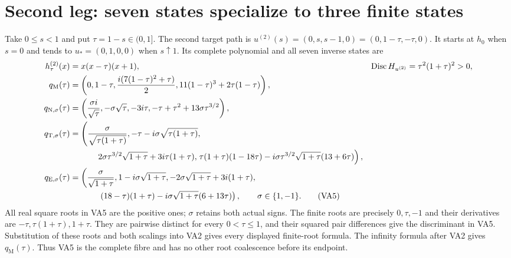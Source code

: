 \documentclass[11pt]{article}
\begin{document}
\section{Second leg: seven states specialize to three finite states}
Take $0\le s<1$ and put $\tau=1-s\in(0,1]$. The second
target path is
$u^{(2)}(s)=(0,s,s-1,0)=(0,1-\tau,-\tau,0)$.
It starts at $h_0$ when $s=0$ and tends to
$u_*=(0,1,0,0)$ when $s\uparrow1$. Its complete polynomial
and all seven inverse states are
\begin{align}
 h^{(2)}_\tau(x)&=x(x-\tau)(x+1),&
 \operatorname{Disc} H_{u^{(2)}}&=\tau^2(1+\tau)^2>0,\nonumber\\
 q_{\mathrm M}(\tau)&=
 \left(0,1-\tau,\frac{i(7(1-\tau)^2+\tau)}2,
                      11(1-\tau)^3+2\tau(1-\tau)\right),\nonumber\\
 q_{\mathrm N,\sigma}(\tau)&=
 \left(\frac{\sigma i}{\sqrt\tau},-\sigma\sqrt\tau,-3i\tau,
                     -\tau+\tau^2+13\sigma\tau^{3/2}\right),\nonumber\\
 q_{\mathrm T,\sigma}(\tau)&=
 \left(\frac{\sigma}{\sqrt{\tau(1+\tau)}},
       -\tau-i\sigma\sqrt{\tau(1+\tau)},\right.\nonumber\\
 &\hspace{12mm}2\sigma\tau^{3/2}\sqrt{1+\tau}+3i\tau(1+\tau),
 \left.\tau(1+\tau)(1-18\tau)
      -i\sigma\tau^{3/2}\sqrt{1+\tau}(13+6\tau)\right),\nonumber\\
 q_{\mathrm E,\sigma}(\tau)&=
 \left(\frac{\sigma}{\sqrt{1+\tau}},1-i\sigma\sqrt{1+\tau},
       -2\sigma\sqrt{1+\tau}+3i(1+\tau),\right.\nonumber\\
 &\hspace{12mm}\left.(18-\tau)(1+\tau)
               -i\sigma\sqrt{1+\tau}(6+13\tau)\right),
 \qquad\sigma\in\{1,-1\}.\tag{VA5}
\end{align}
All real square roots in VA5 are the positive ones; $\sigma$
retains both actual signs. The finite roots are precisely
$0,\tau,-1$ and their derivatives are $-\tau,\tau(1+\tau),1+\tau$.
They are pairwise distinct for every $0<\tau\le1$, and
their squared pair differences give the discriminant in
VA5. Substitution of these roots and both scalings into
VA2 gives every displayed finite-root formula. The infinity
formula after VA2 gives $q_{\mathrm M}(\tau)$.
Thus VA5 is the complete fibre and has no other root
coalescence before its endpoint.
\end{document}
